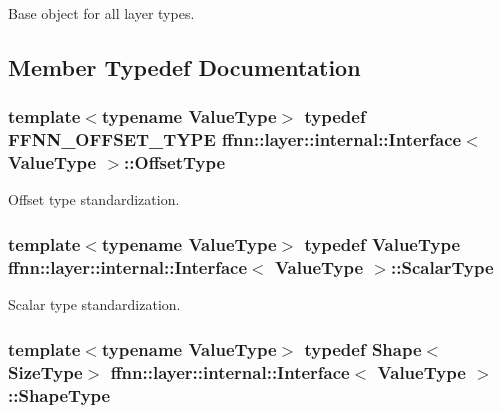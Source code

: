 Base object for all layer types. 

\subsection{Member Typedef Documentation}
\hypertarget{classffnn_1_1layer_1_1internal_1_1_interface_adc5bb454329ebd51ac26579a43c006fd}{
\subsubsection[{Offset\-Type}]{\setlength{\rightskip}{0pt plus 5cm}template$<$typename Value\-Type$>$ typedef {\bf F\-F\-N\-N\-\_\-\-O\-F\-F\-S\-E\-T\-\_\-\-T\-Y\-P\-E} {\bf ffnn\-::layer\-::internal\-::\-Interface}$<$ Value\-Type $>$\-::{\bf Offset\-Type}}}\label{classffnn_1_1layer_1_1internal_1_1_interface_adc5bb454329ebd51ac26579a43c006fd}


Offset type standardization. 

\hypertarget{classffnn_1_1layer_1_1internal_1_1_interface_a7f834e3365e5199bcbcd16d9abd63941}{
\subsubsection[{Scalar\-Type}]{\setlength{\rightskip}{0pt plus 5cm}template$<$typename Value\-Type$>$ typedef Value\-Type {\bf ffnn\-::layer\-::internal\-::\-Interface}$<$ Value\-Type $>$\-::{\bf Scalar\-Type}}}\label{classffnn_1_1layer_1_1internal_1_1_interface_a7f834e3365e5199bcbcd16d9abd63941}


Scalar type standardization. 

\hypertarget{classffnn_1_1layer_1_1internal_1_1_interface_a945709b1d0ea54a51539b80d04485f5f}{
\subsubsection[{Shape\-Type}]{\setlength{\rightskip}{0pt plus 5cm}template$<$typename Value\-Type$>$ typedef {\bf Shape}$<${\bf Size\-Type}$>$ {\bf ffnn\-::layer\-::internal\-::\-Interface}$<$ Value\-Type $>$\-::{\bf Shape\-Type}}}\label{classffnn_1_1layer_1_1internal_1_1_interface_a945709b1d0ea54a51539b80d04485f5f}


